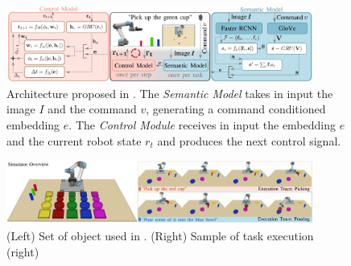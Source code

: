 \begin{figure}[t]
    \centering
    \includegraphics[width=0.9\textwidth]{figures/images/language_conditioned/architecture.jpg}
    \caption{Architecture proposed in \cite{stepputtis2020language}. The \textit{Semantic Model} takes in input the image $I$ and the command $v$, generating a command conditioned embedding $e$. The \textit{Control Module} receives in input the embedding $e$ and the current robot state $r_{t}$ and produces the next control signal.}
    \label{fig:language_conditioned}
\end{figure}

\begin{figure}[t]
    \centering
    \includegraphics[width=0.9\textwidth]{figures/images/language_conditioned/objects.jpg}
    \caption{(Left) Set of object used in \cite{stepputtis2020language}. (Right) Sample of task execution (right)}
    \label{fig:objects}
\end{figure}
